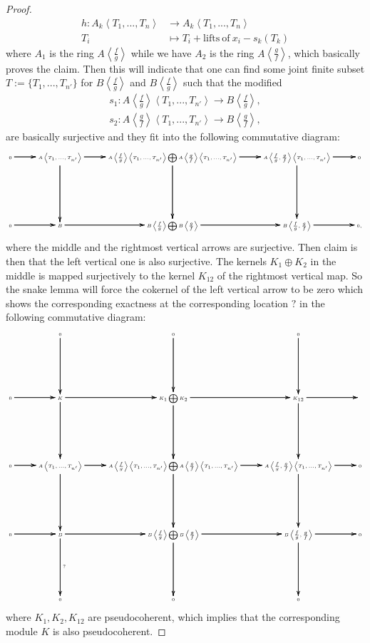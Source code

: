 \documentclass[12pt]{amsart}
\theoremstyle{definition}
\numberwithin{equation}{section}
\begin{document}
\begin{proof}
\begin{align}
h: A_k\left<T_1,...,T_n\right>&\rightarrow A_k\left<T_1,...,T_n\right>\\
	T_i&\mapsto T_i+\mathrm{lifts~of}~x_i-s_k(T_k)
\end{align}
where $A_1$ is the ring $A\left<\frac{f}{g}\right>$ while we have $A_2$ is the ring $A\left<\frac{g}{f}\right>$, which basically proves the claim. Then this will indicate that one can find some joint finite subset $T:=\{T_1,...,T_{n'}\}$ for $B\left<\frac{f}{g}\right>$ and $B\left<\frac{f}{g}\right>$ such that the modified  
\begin{align}
s_1:A\left<\frac{f}{g}\right>\left<T_1,...,T_{n'}\right>\rightarrow B\left<\frac{f}{g}\right>,\\
s_2:A\left<\frac{g}{f}\right>\left<T_1,...,T_{n'}\right>\rightarrow B\left<\frac{g}{f}\right>,	
\end{align}
are basically surjective and they fit into the following commutative diagram:
\[\tiny
\xymatrix@C+0pc@R+3pc{
0 \ar[r] \ar[r] \ar[r] &A\left<T_1,...,T_{n'}\right> \ar[d] \ar[d] \ar[d] \ar[r] \ar[r] \ar[r] &A\left<\frac{f}{g}\right>\left<T_1,...,T_{n'}\right>\bigoplus A\left<\frac{g}{f}\right>\left<T_1,...,T_{n'}\right> \ar[d] \ar[d] \ar[d]\ar[r] \ar[r] \ar[r] &A\left<\frac{f}{g},\frac{g}{f}\right>\left<T_1,...,T_{n'}\right> \ar[d] \ar[d] \ar[d]\ar[r] \ar[r] \ar[r] &0\\
0 \ar[r] \ar[r] \ar[r] &B  \ar[r] \ar[r] \ar[r] &B\left<\frac{f}{g}\right>\bigoplus B\left<\frac{g}{f}\right> \ar[r] \ar[r] \ar[r] &B\left<\frac{f}{g},\frac{g}{f}\right> \ar[r] \ar[r] \ar[r] &0,
}
\]
where the middle and the rightmost vertical arrows are surjective. Then claim is then that the left vertical one is also surjective. The kernels $K_1\oplus K_2$ in the middle is mapped surjectively to the kernel $K_{12}$ of the rightmost vertical map. So the snake lemma will force the cokernel of the left vertical arrow to  be zero which shows the corresponding exactness at the corresponding location $?$ in the following commutative diagram:
\[\tiny
\xymatrix@C+0pc@R+3pc{
 &0 \ar[d] \ar[d] \ar[d]   &0 \ar[d] \ar[d] \ar[d]  &0 \ar[d] \ar[d] \ar[d] & \\
0 \ar[r] \ar[r] \ar[r]& K\ar[d] \ar[d] \ar[d]\ar[r] \ar[r] \ar[r]&K_1\bigoplus K_2 \ar[d] \ar[d] \ar[d]\ar[r] \ar[r] \ar[r]&K_{12} \ar[d] \ar[d] \ar[d]\ar[r] \ar[r] \ar[r]&\\
0 \ar[r] \ar[r] \ar[r] &A\left<T_1,...,T_{n'}\right> \ar[d] \ar[d] \ar[d] \ar[r] \ar[r] \ar[r] &A\left<\frac{f}{g}\right>\left<T_1,...,T_{n'}\right>\bigoplus A\left<\frac{g}{f}\right>\left<T_1,...,T_{n'}\right> \ar[d] \ar[d] \ar[d]\ar[r] \ar[r] \ar[r] &A\left<\frac{f}{g},\frac{g}{f}\right>\left<T_1,...,T_{n'}\right> \ar[d] \ar[d] \ar[d]\ar[r] \ar[r] \ar[r] &0\\
0 \ar[r] \ar[r] \ar[r] &B  \ar[d]^? \ar[d] \ar[d]\ar[r] \ar[r] \ar[r] &B\left<\frac{f}{g}\right>\bigoplus B\left<\frac{g}{f}\right> \ar[d] \ar[d] \ar[d]\ar[r] \ar[r] \ar[r] &B\left<\frac{f}{g},\frac{g}{f}\right> \ar[d] \ar[d] \ar[d]\ar[r] \ar[r] \ar[r] &0\\
 &0   &0  &0 &
}
\]
where $K_1,K_2,K_{12}$ are pseudocoherent, which implies that the corresponding module $K$ is also pseudocoherent.


\end{proof}
\end{document}
